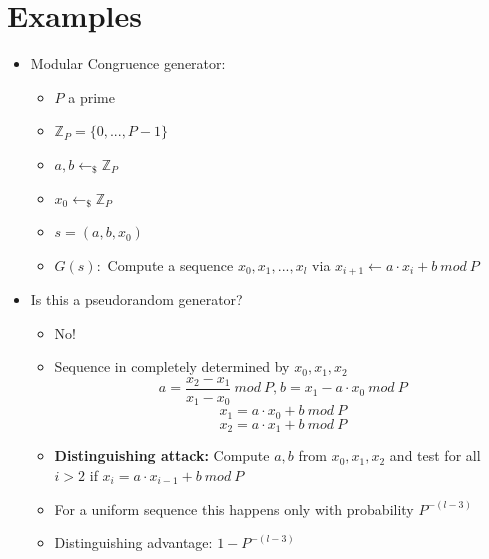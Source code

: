 	\section{Examples}
		\begin{itemize}
			\item Modular Congruence generator:
				\begin{itemize}
					\item $P$ a prime
					\item $\mathbb{Z}_P = \{0,...,P-1\}$
					\item $a,b \leftarrow_{\$} \mathbb{Z}_P$
					\item $x_0 \leftarrow_{\$} \mathbb{Z}_P$
					\item $s = (a,b,x_0)$
					\item $G(s):$ Compute a sequence $x_0,x_1,...,x_l$ via $x_{i+1} \leftarrow a \cdot x_i + b\ mod\ P$
				\end{itemize}
			\item Is this a pseudorandom generator?
				\begin{itemize}
					\item No!
					\item Sequence in completely determined by $x_0,x_1,x_2$
						$$a = \frac{x_2-x_1}{x_1-x_0}\ mod\ P \text{,}\ b = x_1 -a \cdot x_0\ mod\ P$$
						$$x_1 = a \cdot x_0 + b\ mod\ P$$
						$$x_2 = a \cdot x_1 + b\ mod\ P$$
					\item \textbf{Distinguishing attack:} Compute $a,b$ from $x_0,x_1,x_2$ and test for all $i > 2$ if $x_i = a \cdot x_{i-1} + b\ mod\ P$
					\item For a uniform sequence this happens only with probability $P^{-(l-3)}$
					\item Distinguishing advantage: $1-P^{-(l-3)}$
				\end{itemize}
		\end{itemize}
	
